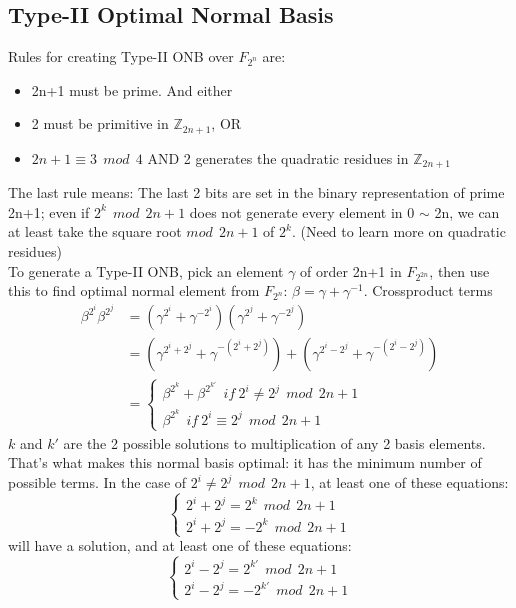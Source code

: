 \documentclass[conference]{IEEEtran}
\begin{document}
	\subsection{Type-II Optimal Normal Basis}
Rules for creating Type-II ONB over $F_{2^n}$ are:
\begin{itemize}
\item 2n+1 must be prime. And either
\item 2 must be primitive in $\mathbb{Z}_{2n+1}$, OR
\item $2n+1 \equiv 3 \ \ mod\ \  4$ AND 2 generates the quadratic residues in $\mathbb{Z}_{2n+1}$
\end{itemize}
The last rule means: The last 2 bits are set in the binary representation of prime 2n+1; even if $2^k \ \ mod\ \  2n+1$ does not
generate every element in 0 $\sim$ 2n, we can at least take the square root $mod\ \  2n+1$ of $2^k$. (Need to learn more on quadratic residues)\\
To generate a Type-II ONB, pick an element $\gamma$ of order 2n+1 in $F_{2^{2n}}$, then use this to find optimal normal 
element from $F_{2^n}$: $\beta = \gamma + \gamma^{-1}$. Crossproduct terms
\begin{equation}
\begin{split}
\beta^{2^i}\beta^{2^j} &= (\gamma^{2^i} + \gamma^{-2^i})(\gamma^{2^j} + \gamma^{-2^j})\\ &= 
(\gamma^{2^i+2^j} + \gamma^{-(2^i+2^j)}) + (\gamma^{2^i-2^j} + \gamma^{-(2^i-2^j)})\\ &= 
\begin{cases}
\beta^{2^k} + \beta^{2^{k\prime}}\ \  if\ 2^i \neq 2^j \ \ mod\ \  2n+1\\
\beta^{2^k}\ \  if\ 2^i \equiv 2^j \ \ mod\ \  2n+1
\end{cases}
\end{split}
\end{equation}
$k$ and $k\prime$ are the 2 possible solutions to multiplication of any 2 basis elements. That's what makes this normal basis
optimal: it has the minimum number of possible terms. In the case of $2^i \neq 2^j \ \ mod\ \  2n+1$, at least one of these
equations:
\begin{equation}
\begin{cases}
2^i + 2^j = 2^k \ \ mod\ \  2n+1\\
2^i + 2^j = -2^k \ \ mod \ \ 2n+1
\end{cases}
\end{equation}
will have a solution, and at least one of these equations:
\begin{equation}
\begin{cases}
2^i - 2^j = 2^{k\prime} \ \ mod \ \ 2n+1\\
2^i - 2^j = -2^{k\prime} \ \ mod \ \ 2n+1
\end{cases}
\end{equation}
\end{document}
